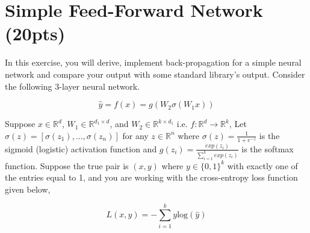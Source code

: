 \documentclass[a4paper]{article}
\theoremstyle{definition}
\begin{document}
\section{Simple Feed-Forward Network (20pts)}
In this exercise, you will derive, implement back-propagation for a simple neural network and compare your output with some standard library’s output. Consider the following 3-layer neural network.

\[
\hat{y} = f(x) = g(W_2\sigma(W_1x))
\]

Suppose $x \in \mathbb{R}^d$, $W_1 \in \mathbb{R}^{d_1 \times d}$, and $W_2 \in \mathbb{R}^{k \times d_1}$ i.e. $f: \mathbb{R}^d \rightarrow \mathbb{R}^k$, Let $\sigma(z) = [\sigma(z_1), ..., \sigma(z_n)]$ for any $z \in \mathbb{R}^n$ where $\sigma(z) = \frac{1}{1 + e^{-z}}$ is the sigmoid (logistic) activation function and $g(z_i) = \frac{exp(z_i)}{\sum_{i=1}^k exp(z_i)}$ is the softmax function. Suppose the true pair is $(x, y)$ where $y \in \{0, 1\}^k$ with exactly one of the entries equal to 1, and you are working with the cross-entropy loss function given below,

\[
L(x, y) = -\sum_{i=1}^k y \text{log}(\hat{y})
\]
\end{document}

